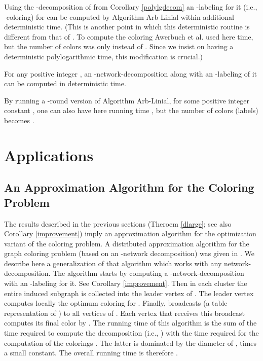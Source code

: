 \documentclass[11pt]{article}
\begin{document}
Using the -decomposition of  from Corollary \ref{polylgdecom} an -labeling for it (i.e., -coloring) for  can be computed by Algorithm Arb-Linial within additional  deterministic time. (This is another point in which this deterministic routine is different from that of \cite{AGLP89}. To compute the coloring Awerbuch et al. \cite{AGLP89} used here  time, but the number of colors was only  instead of . Since we insist on having a deterministic polylogarithmic time, this modification is crucial.)
\begin{col} \label{polylogdecom}
For any positive integer , an -network-decomposition  along with an -labeling of it can be computed in  deterministic time.
\end{col}
By running a -round version of Algorithm Arb-Linial, for some positive integer constant , one can also have here running time , but the number of colors (labels) becomes .































\section{Applications}
\subsection{An Approximation Algorithm for the Coloring Problem}
The results described in the previous sections (Theroem \ref{dlarge}; see also Corollary \ref{improvement}) imply an approximation algorithm for the optimization variant of the coloring problem. 
A distributed approximation algorithm for the graph coloring problem (based on an -network decomposition) was given in \cite{B12}. We describe here a generalization of that algorithm which works with any network-decomposition.
The algorithm starts by computing a -network-decomposition  with an -labeling  for it. See Corollary \ref{improvement}. Then in each cluster  the entire induced subgraph  is collected into the leader vertex  of . The leader vertex  computes locally the optimum coloring  for . Finally,  broadcasts (a table representation of ) to all vertices of . Each vertex  that receives this broadcast computes its final color  by . The running time of this algorithm is the sum of the time required to compute the decomposition  (i.e., ) with the time required for the computation of the colorings . The latter is dominated by the diameter of , times a small constant. The overall running time is therefore .
\end{document}
